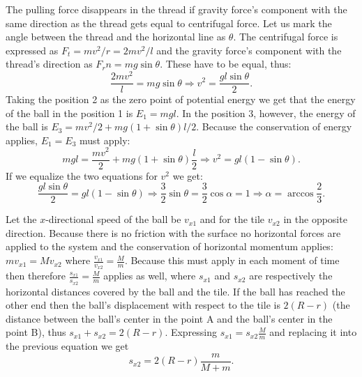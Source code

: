 \documentclass[11pt]{article}
\begin{document}

\solueng
The pulling force disappears in the thread if gravity force’s component with the same direction as the thread gets equal to centrifugal force. Let us mark the angle between the thread and the horizontal line as $\theta$. The centrifugal force is expressed as $F_t=mv^2/r=2mv^2/l$ and the gravity force’s component with the thread’s direction as $F_rn=mg\sin\theta$. These have to be equal, thus:
$$\frac{2mv^2}{l}=mg\sin\theta \Rightarrow v^2=\frac{gl\sin\theta}{2}.$$ 
Taking the position 2 as the zero point of potential energy we get that the energy of the ball in the position 1 is $E_1=mgl$. In the position 3, however, the energy of the ball is $E_3=mv^2/2+mg(1+\sin\theta)l/2$. Because the conservation of energy applies, $E_1=E_3$ must apply:
$$mgl=\frac{mv^2}{2}+mg(1+\sin\theta)\frac{l}{2} \Rightarrow v^2=gl(1-\sin\theta).$$ 
If we equalize the two equations for $v^2$ we get:
$$\frac{gl\sin\theta}{2}=gl(1-\sin\theta)\Rightarrow \frac{3}{2}\sin\theta=\frac{3}{2}\cos\alpha=1 \Rightarrow \alpha=\arccos\frac{2}{3}.$$
\probend
\bigskip


\solueng
Let the $x$-directional speed of the ball be $v_{x1}$ and for the tile $v_{x2}$ in the opposite direction. Because there is no friction with the surface no horizontal forces are applied to the system and the conservation of horizontal momentum applies: $mv_{x1}=Mv_{x2}$ where $\frac{v_{x1}}{v_{x2}}=\frac{M}{m}$. Because this must apply in each moment of time then therefore $\frac{s_{x1}}{s_{x2}}=\frac{M}{m}$ applies as well, where $s_{x1}$ and $s_{x2}$ are respectively the horizontal distances covered by the ball and the tile. If the ball has reached the other end then the ball’s displacement with respect to the tile is $2(R-r)$ (the distance between the ball’s center in the point A and the ball’s center in the point B), thus $s_{x1}+s_{x2}=2(R-r)$. Expressing $s_{x1} = s_{x2}\frac Mm$ and replacing it into the previous equation we get
$$s_{x2}=2(R-r)\frac{m}{M+m}.$$
\probend
\bigskip

\end{document}
